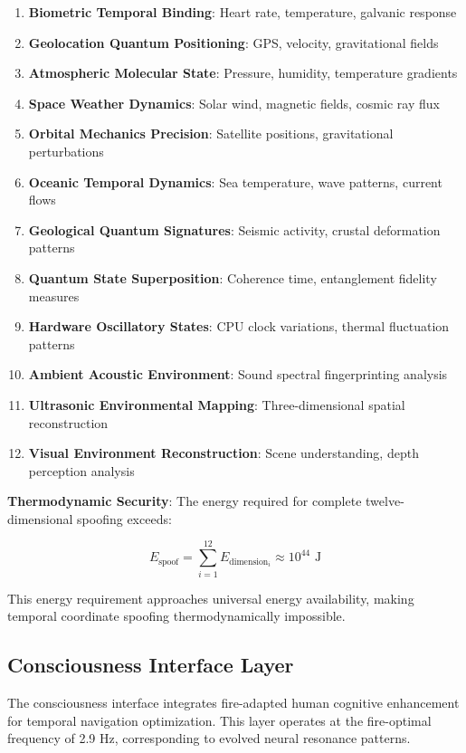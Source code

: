 \documentclass[11pt]{article}
\theoremstyle{remark}
\begin{document}
\begin{enumerate}
\item \textbf{Biometric Temporal Binding}: Heart rate, temperature, galvanic response
\item \textbf{Geolocation Quantum Positioning}: GPS, velocity, gravitational fields
\item \textbf{Atmospheric Molecular State}: Pressure, humidity, temperature gradients
\item \textbf{Space Weather Dynamics}: Solar wind, magnetic fields, cosmic ray flux
\item \textbf{Orbital Mechanics Precision}: Satellite positions, gravitational perturbations
\item \textbf{Oceanic Temporal Dynamics}: Sea temperature, wave patterns, current flows
\item \textbf{Geological Quantum Signatures}: Seismic activity, crustal deformation patterns
\item \textbf{Quantum State Superposition}: Coherence time, entanglement fidelity measures
\item \textbf{Hardware Oscillatory States}: CPU clock variations, thermal fluctuation patterns
\item \textbf{Ambient Acoustic Environment}: Sound spectral fingerprinting analysis
\item \textbf{Ultrasonic Environmental Mapping}: Three-dimensional spatial reconstruction
\item \textbf{Visual Environment Reconstruction}: Scene understanding, depth perception analysis
\end{enumerate}

\textbf{Thermodynamic Security}: The energy required for complete twelve-dimensional spoofing exceeds:

$$E_{\text{spoof}} = \sum_{i=1}^{12} E_{\text{dimension}_i} \approx 10^{44} \text{ J}$$

This energy requirement approaches universal energy availability, making temporal coordinate spoofing thermodynamically impossible.

\subsection{Consciousness Interface Layer}

The consciousness interface integrates fire-adapted human cognitive enhancement for temporal navigation optimization. This layer operates at the fire-optimal frequency of 2.9 Hz, corresponding to evolved neural resonance patterns.
\end{document}
